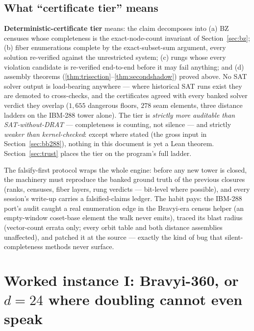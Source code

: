 \documentclass[11pt]{article}
\theoremstyle{plain}
\theoremstyle{definition}
\theoremstyle{remark}
\begin{document}
\subsection{What ``certificate tier'' means}
\label{sec:tier}

\begin{inputbox}
\textbf{Deterministic-certificate tier} means: the claim decomposes into
(a) BZ censuses whose completeness is the exact-node-count invariant of
Section~\ref{sec:bz}; (b) fiber enumerations complete by the
exact-subset-sum argument, every solution re-verified against the
unrestricted system; (c) rungs whose every violation candidate is
re-verified end-to-end before it may fail anything; and (d) assembly
theorems (\ref{thm:trisection}--\ref{thm:secondshadow}) proved above.
No SAT solver output is load-bearing anywhere --- where historical SAT
runs exist they are demoted to cross-checks, and the certificates agreed
with every banked solver verdict they overlap ($1{,}655$ dangerous
floors, $278$ seam elements, three distance ladders on the IBM-288 tower
alone). The tier is \emph{strictly more auditable than SAT-without-DRAT}
--- completeness is counting, not silence --- and strictly \emph{weaker
than kernel-checked}: except where stated (the gross input in
Section~\ref{sec:bb288}), nothing in this document is yet a Lean theorem.
Section~\ref{sec:trust} places the tier on the program's full ladder.
\end{inputbox}

The falsify-first protocol wraps the whole engine: before any new tower
is closed, the machinery must reproduce the banked ground truth of the
previous closures (ranks, censuses, fiber layers, rung verdicts ---
bit-level where possible), and every session's write-up carries a
falsified-claims ledger. The habit pays: the IBM-288 port's audit caught
a real enumeration edge in the Bravyi-era census helper (an empty-window
coset-base element the walk never emits), traced its blast radius
(vector-count errata only; every orbit table and both distance
assemblies unaffected), and patched it at the source --- exactly the
kind of bug that silent-completeness methods never surface.

\section{Worked instance I: Bravyi-360, or \texorpdfstring{$d = 24$}{d=24}
where doubling cannot even speak}
\label{sec:bravyi}
\end{document}
